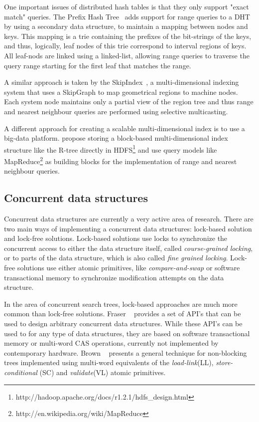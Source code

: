 \documentclass[11pt,a4paper]{globis-book}
\begin{document}
One important issues of distributed hash tables is that they only support "exact match" queries. The Prefix Hash Tree~\cite{Ramabhadran04prefixhash} adds support for range queries to a DHT by using a secondary data structure, to maintain a mapping between nodes and keys. This mapping is a trie containing the prefixes of the bit-strings of the keys, and thus, logically, leaf nodes of this trie correspond to interval regions of keys. All leaf-nods are linked using a linked-list, allowing range queries to traverse the query range starting for the first leaf that matches the range. 

A similar approach is taken by the SkipIndex~\cite{Zhang04skipindex}, a multi-dimensional indexing system that uses a SkipGraph to map geometrical regions to machine nodes. Each system node maintains only a partial view of the region tree and thus range and nearest neighbour queries are performed using selective multicasting.

A different approach for creating a scalable multi-dimensional index is to use a big-data platform. \cite{Liao2010HadoopIndex} propose storing a block-based multi-dimensional index structure like the R-tree directly in HDFS\footnote{http://hadoop.apache.org/docs/r1.2.1/hdfs\_design.html} and use query models like MapReduce\footnote{http://en.wikipedia.org/wiki/MapReduce} as building blocks for the implementation of range and nearest neighbour queries.

\subsection{Concurrent data structures}

Concurrent data structures are currently a very active area of research. There are two main ways of implementing a concurrent data structures: lock-based solution and lock-free solutions. Lock-based solutions use locks to synchronize the concurrent access to either the data structure itself, called \textit{course-grained locking}, or to parts of the data structure, which is also called \textit{fine grained locking}. Lock-free solutions use either atomic primitives, like \textit{compare-and-swap} or software transactional memory to synchronize modification attempts on the data structure.

In the area of concurrent search trees, lock-based approaches are much more common than lock-free solutions. Fraser ~\cite{Fraser2007concurrent} provides a set of API's that can be used to design arbitrary concurrent data structures. While these API's can be used to for any type of data structures, they are based on software transactional memory or multi-word CAS operations, currently not implemented by contemporary hardware. Brown ~\cite{Brown2014concurrent} presents a general technique for non-blocking trees implemented using multi-word equivalents of the \textit{load-link}(LL), \textit{store-conditional} (SC) and \textit{validate}(VL) atomic primitives.
\end{document}
